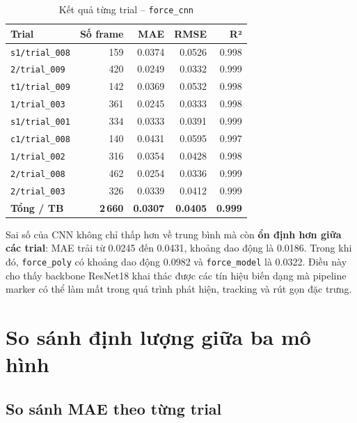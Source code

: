 \begin{table}[h]
\centering
\caption{Kết quả từng trial -- \texttt{force\_cnn}}
\label{tab:cnn_trial}
\begin{tabular}{lrrrr}
\toprule
\textbf{Trial} & \textbf{Số frame} & \textbf{MAE} & \textbf{RMSE} & \textbf{R²} \\
\midrule
\texttt{s1/trial\_008} & 159 & 0.0374 & 0.0526 & 0.998 \\
\texttt{2/trial\_009}  & 420 & 0.0249 & 0.0332 & 0.999 \\
\texttt{t1/trial\_009} & 142 & 0.0369 & 0.0532 & 0.998 \\
\texttt{1/trial\_003}  & 361 & 0.0245 & 0.0333 & 0.998 \\
\texttt{s1/trial\_001} & 334 & 0.0333 & 0.0391 & 0.999 \\
\texttt{c1/trial\_008} & 140 & 0.0431 & 0.0595 & 0.997 \\
\texttt{1/trial\_002}  & 316 & 0.0354 & 0.0428 & 0.998 \\
\texttt{2/trial\_008}  & 462 & 0.0254 & 0.0336 & 0.999 \\
\texttt{2/trial\_003}  & 326 & 0.0339 & 0.0412 & 0.999 \\
\midrule
\textbf{Tổng / TB} & \textbf{2\,660} & \textbf{0.0307} & \textbf{0.0405} & \textbf{0.999} \\
\bottomrule
\end{tabular}
\end{table}

Sai số của CNN không chỉ thấp hơn về trung bình mà còn \textbf{ổn định hơn
giữa các trial}: MAE trải từ 0.0245 đến 0.0431, khoảng dao động là 0.0186.
Trong khi đó, \texttt{force\_poly} có khoảng dao động 0.0982 và
\texttt{force\_model} là 0.0322. Điều này cho thấy backbone ResNet18 khai
thác được các tín hiệu biến dạng mà pipeline marker có thể làm mất trong quá
trình phát hiện, tracking và rút gọn đặc trưng.

\section{So sánh định lượng giữa ba mô hình}
\label{sec:comparison}

\subsection{So sánh MAE theo từng trial}

